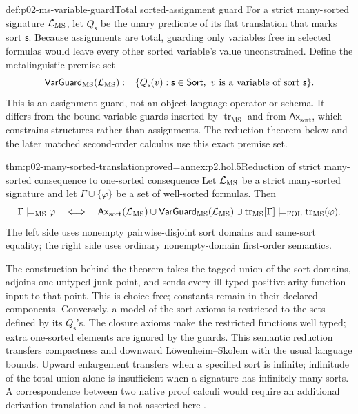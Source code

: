\begin{hbdefinition}{def:p02-ms-variable-guard}{Total sorted-assignment guard}
For a strict many-sorted signature \(\mathcal{L}_{\mathrm{MS}}\), let
\(Q_{\mathsf s}\) be the unary predicate of its flat translation that marks
sort \(\mathsf s\).  Because assignments are total, guarding only variables
free in selected formulas would leave every other sorted variable's value
unconstrained.  Define the metalinguistic premise set
\[
 \mathsf{VarGuard}_{\mathrm{MS}}(\mathcal{L}_{\mathrm{MS}})
 \mathrel{:=}\{Q_{\mathsf s}(v):\mathsf s\in\mathsf{Sort},
       \ v\text{ is a variable of sort }\mathsf s\}.
\]
This is an assignment guard, not an object-language operator or schema.  It
differs from the bound-variable guards inserted by
\(\operatorname{tr}_{\mathrm{MS}}\) and from
\(\mathsf{Ax}_{\mathrm{sort}}\), which constrains structures rather than
assignments.  The reduction theorem below and the later matched second-order
calculus use this exact premise set.
\end{hbdefinition}

\begin{hbtheorem}{thm:p02-many-sorted-translation}{proved=annex:p2.hol.5}{Reduction of strict many-sorted consequence to one-sorted consequence}
Let \(\mathcal{L}_{\mathrm{MS}}\) be a strict many-sorted signature and let
\(\Gamma\cup\{\varphi\}\) be a set of well-sorted formulas.  Then
\[
 \Gamma\models_{\mathrm{MS}}\varphi
 \quad\Longleftrightarrow\quad
 \mathsf{Ax}_{\mathrm{sort}}(\mathcal{L}_{\mathrm{MS}})
   \cup\mathsf{VarGuard}_{\mathrm{MS}}(\mathcal{L}_{\mathrm{MS}})
   \cup\operatorname{tr}_{\mathrm{MS}}[\Gamma]
 \models_{\mathrm{FOL}}
   \operatorname{tr}_{\mathrm{MS}}(\varphi).
\]
The left side uses nonempty pairwise-disjoint sort domains and same-sort
equality; the right side uses ordinary nonempty-domain first-order semantics.
\end{hbtheorem}

The construction behind the theorem takes the tagged union of the sort
domains, adjoins one untyped junk point, and sends every ill-typed
positive-arity function input to that point.  This is choice-free; constants
remain in their declared components.  Conversely, a model of the sort axioms is restricted to the sets
defined by its \(Q_{\mathsf s}\)'s.  The closure axioms make the restricted functions
well typed; extra one-sorted elements are ignored by the guards.  This semantic
reduction transfers compactness and downward L\"owenheim--Skolem with the
usual language bounds.  Upward enlargement transfers when a specified sort
is infinite; infinitude of the total union alone is insufficient when a
signature has infinitely many sorts.  A correspondence between two native proof
calculi would require an additional derivation translation and is not asserted
here \cite{Manzano1996}.

